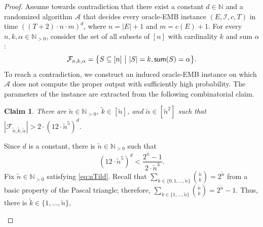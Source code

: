 \documentclass[11pt,letter]{article}
\newcommand{\cA}{{\mathcal{A}}}
\newcommand{\cI}{{\mathcal{I}}}
\newtheorem{claim}[lemma]{Claim}
\begin{document}
\thmemb*
	\begin{proof}
		Assume towards contradiction that there exist a constant $d \in \mathbb{N}$ and a randomized algorithm $\cA$ that decides every oracle-EMB instance $(E,\cI,c,T)$ in time $\left( (T+2) \cdot n \cdot m \right)^{d}$, where $n = |E|+1$ and $m = c(E)+1$.  
		For every $n,k,\alpha \in \mathbb{N}_{>0}$, consider the set of all subsets of $[n]$ with cardinality $k$ and sum $\alpha$: $$\mathcal{F}_{n,k,\alpha} = \big\{S \subseteq [n]~\big|~|S| = k, \textnormal{\textsf{sum}}(S) = \alpha\big\}.$$ 
		To reach a contradiction, we construct an induced oracle-EMB instance on which $\cA$ does not compute the proper output with sufficiently high probability. The parameters of the instance are extracted from the following combinatorial claim. 
			\begin{claim}
			\label{claim:H1}
			There are $\tilde{n} \in \mathbb{N}_{>0}$, $\tilde{k} \in \left[\tilde{n}\right]$, and $\tilde{\alpha} \in \left[\tilde{n}^2\right]$ such that 
$|\mathcal{F}_{\tilde{n},\tilde{k},\tilde{\alpha}}|> 	2 \cdot \left(	12 \cdot \tilde{n}^5 \right)^{d} $. 
		\end{claim}
		\begin{claimproof}
				Since $d$ is a constant, %
				there is $\tilde{n} \in \mathbb{N}_{>0}$ such that 
				\begin{equation}
					\label{eq:nTild}
						\left(	12 \cdot \tilde{n}^5 \right)^{d} < \frac{2^{\tilde{n}}-1}{2 \cdot \tilde{n}^3}.
				\end{equation}
				  Fix $\tilde{n} \in \mathbb{N}_{>0}$ satisfying \eqref{eq:nTild}. Recall that $\sum_{k \in \{0,1,\ldots,\tilde{n}\}} {\tilde{n} \choose k} = 2^{\tilde{n}}$ from a basic property of the Pascal triangle; therefore, $\sum_{k \in \{1,\ldots,\tilde{n}\}} {\tilde{n} \choose k} = 2^{\tilde{n}}-1$. Thus, there is  $\tilde{k} \in \{1,\ldots,\tilde{n}\}$, 

\end{claimproof}
\end{proof}
\end{document}

